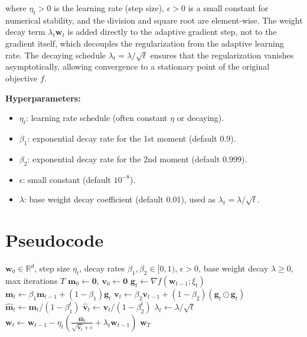 \documentclass{article}
\theoremstyle{plain}
\theoremstyle{definition}
\renewcommand{\vec}[1]{\boldsymbol{#1}}
\newcommand{\R}{\mathbb{R}}
\begin{document}
where $\eta_t > 0$ is the learning rate (step size), $\epsilon > 0$ is a small constant for numerical stability, and the division and square root are element-wise. The weight decay term $\lambda_t \vec{w}_t$ is added directly to the adaptive gradient step, not to the gradient itself, which decouples the regularization from the adaptive learning rate. The decaying schedule $\lambda_t = \lambda/\sqrt{t}$ ensures that the regularization vanishes asymptotically, allowing convergence to a stationary point of the original objective $f$.

\textbf{Hyperparameters:}
\begin{itemize}
    \item $\eta_t$: learning rate schedule (often constant $\eta$ or decaying).
    \item $\beta_1$: exponential decay rate for the 1st moment (default 0.9).
    \item $\beta_2$: exponential decay rate for the 2nd moment (default 0.999).
    \item $\epsilon$: small constant (default $10^{-8}$).
    \item $\lambda$: base weight decay coefficient (default 0.01), used as $\lambda_t = \lambda/\sqrt{t}$.
\end{itemize}

\section*{Pseudocode}

\begin{algorithm}[H]
\caption{AdamW with Decaying Weight Decay}
\begin{algorithmic}[1]
\Require $\vec{w}_0 \in \R^d$, step size $\eta_t$, decay rates $\beta_1, \beta_2 \in [0,1)$, $\epsilon > 0$, base weight decay $\lambda \ge 0$, max iterations $T$
\State $\vec{m}_0 \gets \vec{0}$, $\vec{v}_0 \gets \vec{0}$
    \State $\vec{g}_t \gets \nabla f(\vec{w}_{t-1}; \xi_t)$ 
    \State $\vec{m}_t \gets \beta_1 \vec{m}_{t-1} + (1 - \beta_1) \vec{g}_t$
    \State $\vec{v}_t \gets \beta_2 \vec{v}_{t-1} + (1 - \beta_2) (\vec{g}_t \odot \vec{g}_t)$
    \State $\hat{\vec{m}}_t \gets \vec{m}_t / (1 - \beta_1^t)$
    \State $\hat{\vec{v}}_t \gets \vec{v}_t / (1 - \beta_2^t)$
    \State $\lambda_t \gets \lambda / \sqrt{t}$
    \State $\vec{w}_t \gets \vec{w}_{t-1} - \eta_t \left( \frac{\hat{\vec{m}}_t}{\sqrt{\hat{\vec{v}}_t} + \epsilon} + \lambda_t \vec{w}_{t-1} \right)$
\EndFor
\State \Return $\vec{w}_T$
\end{algorithmic}
\end{algorithm}
\end{document}
